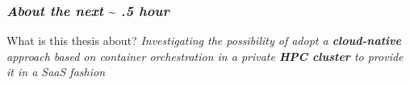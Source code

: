 \begin{frame}
  \frametitle{ \textit{About the next }\sim \textit{  .5 hour}}
  \begin{block}{ What is this thesis about?}
    \textit{
      Investigating the possibility of adopt a \alert{\textbf{cloud-native}} approach based on
      container orchestration in a private \alert{\textbf{HPC cluster}} to provide it in a SaaS
      fashion
%
    }
  \end{block}
\end{frame}

